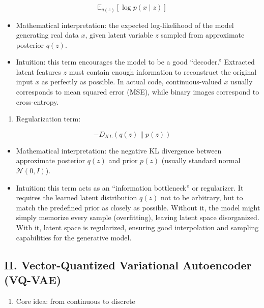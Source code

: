 \[
\mathbb{E}_{q(z)}[\log p(x \mid z)]
\]

\begin{itemize}
\tightlist
\item
  Mathematical interpretation: the expected log-likelihood of the model generating real data \(x\), given latent variable \(z\) sampled from approximate posterior \(q(z)\).
\item
  Intuition: this term encourages the model to be a good ``decoder.'' Extracted latent features \(z\) must contain enough information to reconstruct the original input \(x\) as perfectly as possible. In actual code, continuous-valued \(x\) usually corresponds to mean squared error (MSE), while binary images correspond to cross-entropy.
\end{itemize}

\begin{enumerate}
\def\labelenumi{\arabic{enumi}.}
\setcounter{enumi}{1}
\tightlist
\item
{}
  Regularization term:
\end{enumerate}

\[
- D_{KL}(q(z)\parallel p(z))
\]

\begin{itemize}
\tightlist
\item
  Mathematical interpretation: the negative KL divergence between approximate posterior \(q(z)\) and prior \(p(z)\) (usually standard normal \(\mathcal{N}(0, I)\)).
\item
  Intuition: this term acts as an ``information bottleneck'' or regularizer. It requires the learned latent distribution \(q(z)\) not to be arbitrary, but to match the predefined prior as closely as possible. Without it, the model might simply memorize every sample (overfitting), leaving latent space disorganized. With it, latent space is regularized, ensuring good interpolation and sampling capabilities for the generative model.
\end{itemize}

\hypertarget{ii.-vector-quantized-variational-autoencoder-vq-vae}{%
\subsection{II. Vector-Quantized Variational Autoencoder (VQ-VAE)}\label{ii.-vector-quantized-variational-autoencoder-vq-vae}}

\begin{enumerate}
\def\labelenumi{\arabic{enumi}.}
\tightlist
\item
  Core idea: from continuous to discrete
\end{enumerate}

